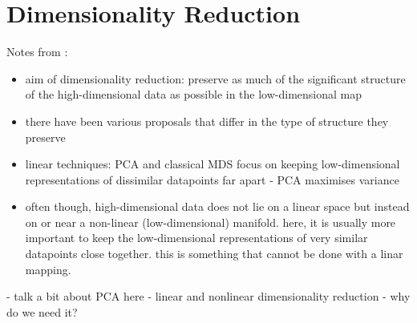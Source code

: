 \chapter{Dimensionality Reduction}\label{chapter:dimensionality-reduction}
Notes from \cite{vdMaa08}: 
\begin{itemize}
    \item aim of dimensionality reduction: preserve as much of the significant structure of the high-dimensional data as possible in the low-dimensional map 
    \item there have been various proposals that differ in the type of structure they preserve 
    \item linear techniques: PCA and classical MDS focus on keeping low-dimensional representations of dissimilar datapoints far apart - PCA maximises variance 
    \item often though, high-dimensional data does not lie on a linear space but instead on or near a non-linear (low-dimensional) manifold. here, it is usually more important to keep the low-dimensional representations of very similar datapoints close together. this is something that cannot be done with a linar mapping. 
\end{itemize}


- talk a bit about PCA here 
- linear and nonlinear dimensionality reduction 
- why do we need it? 